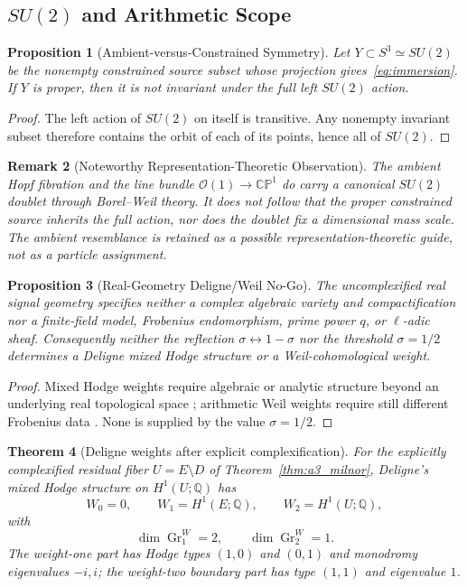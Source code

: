 \documentclass[11pt]{article}
\newtheorem{theorem}{Theorem}[section]
\newtheorem{proposition}[theorem]{Proposition}
\newtheorem{remark}[theorem]{Remark}
\begin{document}
\subsection{\texorpdfstring{$SU(2)$}{SU(2)} and Arithmetic Scope}

\begin{proposition}[Ambient-versus-Constrained Symmetry]
\label{prop:su2_scope}
Let $Y\subset S^3\simeq SU(2)$ be the nonempty constrained source subset whose
projection gives~\eqref{eq:immersion}.  If $Y$ is proper, then it is not
invariant under the full left $SU(2)$ action.
\end{proposition}

\begin{proof}
The left action of $SU(2)$ on itself is transitive.  Any nonempty invariant
subset therefore contains the orbit of each of its points, hence all of
$SU(2)$.
\end{proof}

\begin{remark}[Noteworthy Representation-Theoretic Observation]
The ambient Hopf fibration and the line bundle $\mathcal O(1)\to\mathbb{CP}^1$
do carry a canonical $SU(2)$ doublet through Borel--Weil theory.  It does not
follow that the proper constrained source inherits the full action, nor does
the doublet fix a dimensional mass scale.  The ambient resemblance is retained
as a possible representation-theoretic guide, not as a particle assignment.
\end{remark}

\begin{proposition}[Real-Geometry Deligne/Weil No-Go]
\label{prop:deligne_scope}
The uncomplexified real signal geometry specifies neither a complex algebraic
variety and compactification nor a finite-field model, Frobenius endomorphism,
prime power $q$, or $\ell$-adic sheaf.  Consequently neither the reflection
$\sigma\leftrightarrow1-\sigma$ nor the threshold $\sigma=1/2$ determines a
Deligne mixed Hodge structure or a Weil-cohomological weight.
\end{proposition}

\begin{proof}
Mixed Hodge weights require algebraic or analytic structure beyond an
underlying real topological space \cite{Deligne1971,Deligne1974}; arithmetic
Weil weights require still different Frobenius data \cite{Deligne1980}.  None
is supplied by the value $\sigma=1/2$.
\end{proof}

\begin{theorem}[Deligne weights after explicit complexification]
\label{thm:complex_deligne}
For the explicitly complexified residual fiber $U=E\setminus D$ of
Theorem~\ref{thm:a3_milnor}, Deligne's mixed Hodge structure on
$H^1(U;\mathbb Q)$ has
\[
 W_0=0,\qquad W_1=H^1(E;\mathbb Q),\qquad W_2=H^1(U;\mathbb Q),
\]
with
\[
 \dim\operatorname{Gr}^W_1=2,
 \qquad \dim\operatorname{Gr}^W_2=1.
\]
The weight-one part has Hodge types $(1,0)$ and $(0,1)$ and monodromy
eigenvalues $-i,i$; the weight-two boundary part has type $(1,1)$ and
eigenvalue $1$.
\end{theorem}
\end{document}
